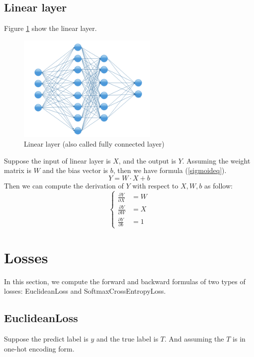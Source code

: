 \documentclass{elegantbook}
\begin{document}
\subsection{Linear layer}
Figure \ref{linear} show the linear layer. 
\begin{figure}[!ht]
	\centering
	\includegraphics[width=0.6\textwidth]{linear.png}
	\caption{\label{linear}Linear layer (also called fully connected layer)}
\end{figure}

Suppose the input of linear layer is $X$, and the output is $Y$. Assuming the weight matrix is $W$ and the bias vector is $b$, then we have formula (\ref{sigmoideq}).
\begin{equation}
\label{lineareq}
Y = W\cdot X + b
\end{equation}
Then we can compute the derivation of $Y$ with respect to $X, W, b$ as follow:
\begin{equation}
\left\{
\begin{aligned}
\frac{\partial Y}{\partial X}&=W \\
\frac{\partial Y}{\partial W}&=X \\
\frac{\partial Y}{\partial b}&=1
\end{aligned}\right.
\end{equation}

\section{Losses}
In this section, we compute the forward and backward formulas of two types of losses: EuclideanLoss and SoftmaxCrossEntropyLoss.

\subsection{EuclideanLoss}
Suppose the predict label is $y$ and the true label is $T$. And assuming the $T$ is in one-hot encoding form.
\end{document}
